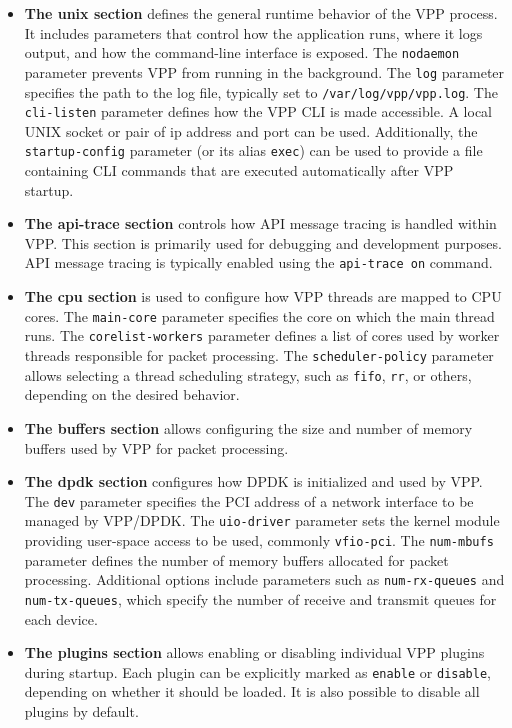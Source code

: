 \begin{itemize}
  \item \textbf{The unix section} defines the general runtime behavior of the VPP process. 
It includes parameters that control how the application runs, where it logs output, and how the command-line interface is exposed. 
The \texttt{nodaemon} parameter prevents VPP from running in the background. 
The \texttt{log} parameter specifies the path to the log file, typically set to \texttt{/var/log/vpp/vpp.log}. 
The \texttt{cli-listen} parameter defines how the VPP CLI is made accessible. A local UNIX socket or pair of ip address and port can be used. 
Additionally, the \texttt{startup-config} parameter (or its alias \texttt{exec}) can be used to provide a file containing CLI commands 
that are executed automatically after VPP startup.~\cite{fdio-config-reference}

  \item \textbf{The api-trace section} controls how API message tracing is handled within VPP.  
This section is primarily used for debugging and development purposes. 
API message tracing is typically enabled using the \texttt{api-trace on} command.~\cite{fdio-config-reference}

  \item \textbf{The cpu section} is used to configure how VPP threads are mapped to CPU cores.  
The \texttt{main-core} parameter specifies the core on which the main thread runs.  
The \texttt{corelist-workers} parameter defines a list of cores used by worker threads responsible for packet processing.  
The \texttt{scheduler-policy} parameter allows selecting a thread scheduling strategy, such as \texttt{fifo}, \texttt{rr}, or others, depending on the desired behavior.~\cite{fdio-config-reference}

  \item \textbf{The buffers section} allows configuring the size and number of memory buffers used by VPP for packet processing.~\cite{fdio-config-reference}  

  \item \textbf{The dpdk section} configures how DPDK is initialized and used by VPP.
The \texttt{dev} parameter specifies the PCI address of a network interface to be managed by VPP/DPDK.  
The \texttt{uio-driver} parameter sets the kernel module providing user-space access to be used, commonly \texttt{vfio-pci}.  
The \texttt{num-mbufs} parameter defines the number of memory buffers allocated for packet processing.  
Additional options include parameters such as \texttt{num-rx-queues} and \texttt{num-tx-queues}, which specify the number of receive and transmit queues for each device.~\cite{fdio-config-reference}

  \item \textbf{The plugins section} allows enabling or disabling individual VPP plugins during startup.  
Each plugin can be explicitly marked as \texttt{enable} or \texttt{disable}, depending on whether it should be loaded. It is also possible to disable all plugins by default.~\cite{fdio-config-reference}  

\end{itemize}

